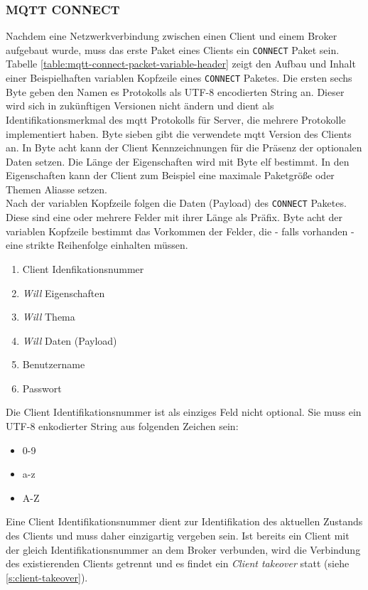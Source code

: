 \subsubsection{MQTT CONNECT} \label{s:mqtt-connect}
Nachdem eine Netzwerkverbindung zwischen einen Client und einem Broker aufgebaut wurde, muss das erste Paket eines Clients ein \verb|CONNECT| Paket sein. Tabelle \ref{table:mqtt-connect-packet-variable-header} zeigt den Aufbau und Inhalt einer Beispielhaften variablen Kopfzeile eines \verb|CONNECT| Paketes. Die ersten sechs Byte geben den Namen es Protokolls als UTF-8 encodierten String an. Dieser wird sich in zukünftigen Versionen nicht ändern und dient als Identifikationsmerkmal des \ac{mqtt} Protokolls für Server, die mehrere Protokolle implementiert haben. Byte sieben gibt die verwendete \ac{mqtt} Version des Clients an. In Byte acht kann der Client Kennzeichnungen für die Präsenz der optionalen Daten setzen. Die Länge der Eigenschaften wird mit Byte elf bestimmt. In den Eigenschaften kann der Client zum Beispiel eine maximale Paketgrö{\ss}e oder Themen Aliasse setzen.\cite{mqtt5Specification}\\
Nach der variablen Kopfzeile folgen die Daten (Payload) des \verb|CONNECT| Paketes. Diese sind eine oder mehrere Felder mit ihrer Länge als Präfix. Byte acht der variablen Kopfzeile bestimmt das Vorkommen der Felder, die - falls vorhanden - eine strikte Reihenfolge einhalten müssen.
\begin{enumerate}
    \item Client Idenfikationsnummer
    \item \textit{Will} Eigenschaften
    \item \textit{Will} Thema
    \item \textit{Will} Daten (Payload)
    \item Benutzername
    \item Passwort
\end{enumerate}
Die Client Identifikationsnummer ist als einziges Feld nicht optional. Sie muss ein UTF-8 enkodierter String aus folgenden Zeichen sein:
\begin{itemize}
    \item 0-9
    \item a-z
    \item A-Z
\end{itemize}
Eine Client Identifikationsnummer dient zur Identifikation des aktuellen Zustands des Clients und muss daher einzigartig vergeben sein. Ist bereits ein Client mit der gleich Identifikationsnummer an dem Broker verbunden, wird die Verbindung des existierenden Clients getrennt und es findet ein \textit{Client takeover} statt (siehe \ref{s:client-takeover}).\cite{mqtt5Specification}
